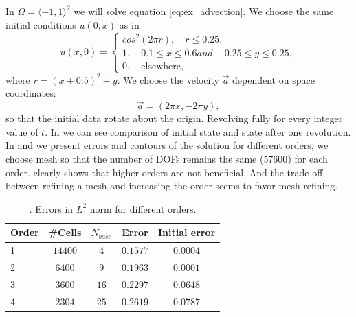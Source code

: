 \begin{example}[Advection 2D]
    \label{ex:adv2D_kriv}
    In $\Omega = \langle -1, 1 \rangle^2$ we will solve equation \eqref{eq:ex_advection}.
    We choose the same initial conditions $u(0, x)$ as in \cite{Krivodonova2007}
    \begin{equation}
        u(x, 0) =\begin{cases}
        cos^2(2\pi r), \quad r \leq 0.25,\\
        1, \quad 0.1 \leq x \leq 0.6 and -0.25 \leq y \leq 0.25,\\
        0, \quad \mathrm{elsewhere},
        \end{cases}
    \end{equation}
    where $r = (x + 0.5)^2 + y$. We choose the velocity $\vec{a}$ dependent on space 
    coordinates:
    $$
    \vec{a} = (2\pi x, -2\pi y),
    $$
    so that the initial data rotate about the origin. Revolving fully for every integer 
    value of $t$. In  we can see comparison of initial state and 
    state after one revolution. In  and  we 
    present errors and contours of the solution for different orders, we choose mesh so 
    that the number of DOFs remains the same ($57600$) for each order. 
     clearly shows that higher orders are not beneficial. And the 
    trade off between refining a mesh and increasing the order seems to favor mesh 
    refining.    
    \begin{table}[p!]
        \centering    
        \caption{. Errors in $L^2$ norm for different orders.}    
        \label{tab:errs_adv2D}
        \begin{tabular}{lcccc}
            \toprule
            Order & \#Cells & $N_{base}$ & Error & Initial error \\ 
            \midrule
            1&$14400$&$ 4$&$0.1577$&$0.0004$\\
            2&$6400 $&$ 9$&$0.1963$&$0.0001$\\
            3&$3600 $&$16$&$0.2297$&$0.0648$\\
            4&$2304 $&$25$&$0.2619$&$0.0787$\\
            \bottomrule 
        \end{tabular} 
    \end{table}
\end{example}


